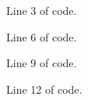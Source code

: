 \documentclass{article}
\begin{document}
Line 3 of code.

\vspace{100pt}
Line 6 of code.

\vspace{150pt}
Line 9 of code.

\vspace{200pt}
Line 12 of code.
\end{document}
